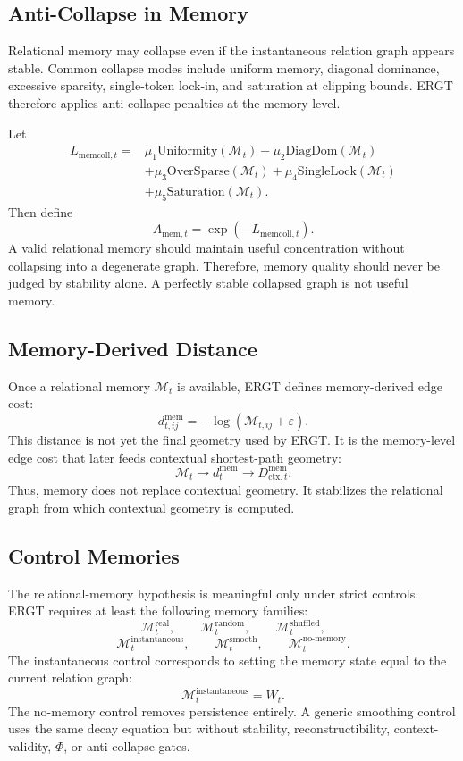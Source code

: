 \documentclass[11pt]{article}
\begin{document}
\subsection{Anti-Collapse in Memory}

Relational memory may collapse even if the instantaneous relation graph appears stable. Common collapse modes include uniform memory, diagonal dominance, excessive sparsity, single-token lock-in, and saturation at clipping bounds. ERGT therefore applies anti-collapse penalties at the memory level.

Let
\[
\begin{aligned}
L_{\mathrm{memcoll},t}
={}&
\mu_1\mathrm{Uniformity}(\mathcal{M}_t)
+
\mu_2\mathrm{DiagDom}(\mathcal{M}_t)\\
&+
\mu_3\mathrm{OverSparse}(\mathcal{M}_t)
+
\mu_4\mathrm{SingleLock}(\mathcal{M}_t)\\
&+
\mu_5\mathrm{Saturation}(\mathcal{M}_t).
\end{aligned}
\]
Then define
\[
A_{\mathrm{mem},t}=\exp(-L_{\mathrm{memcoll},t}).
\]
A valid relational memory should maintain useful concentration without collapsing into a degenerate graph. Therefore, memory quality should never be judged by stability alone. A perfectly stable collapsed graph is not useful memory.

\subsection{Memory-Derived Distance}

Once a relational memory $\mathcal{M}_t$ is available, ERGT defines memory-derived edge cost:
\[
d_{t,ij}^{\mathrm{mem}}
=
-\log(\mathcal{M}_{t,ij}+\varepsilon).
\]
This distance is not yet the final geometry used by ERGT. It is the memory-level edge cost that later feeds contextual shortest-path geometry:
\[
\mathcal{M}_t
\rightarrow
d_t^{\mathrm{mem}}
\rightarrow
D_{\mathrm{ctx},t}^{\mathrm{mem}}.
\]
Thus, memory does not replace contextual geometry. It stabilizes the relational graph from which contextual geometry is computed.

\subsection{Control Memories}

The relational-memory hypothesis is meaningful only under strict controls. ERGT requires at least the following memory families:
\[
\mathcal{M}_t^{\mathrm{real}},
\qquad
\mathcal{M}_t^{\mathrm{random}},
\qquad
\mathcal{M}_t^{\mathrm{shuffled}},
\]
\[
\mathcal{M}_t^{\mathrm{instantaneous}},
\qquad
\mathcal{M}_t^{\mathrm{smooth}},
\qquad
\mathcal{M}_t^{\mathrm{no\text{-}memory}}.
\]
The instantaneous control corresponds to setting the memory state equal to the current relation graph:
\[
\mathcal{M}_t^{\mathrm{instantaneous}}=W_t.
\]
The no-memory control removes persistence entirely. A generic smoothing control uses the same decay equation but without stability, reconstructibility, context-validity, $\Phi$, or anti-collapse gates.
\end{document}
